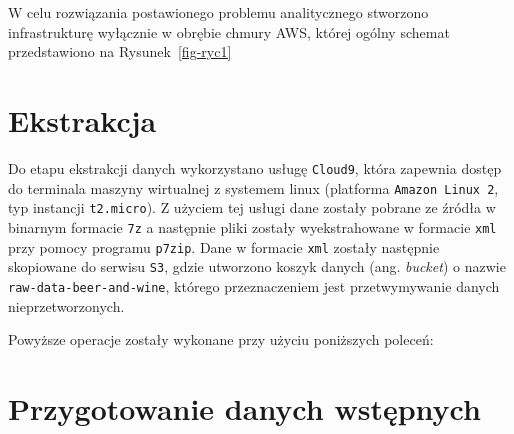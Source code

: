\documentclass[
  letterpaper,
  DIV=11,
  numbers=noendperiod]{scrreprt}
\newenvironment{Shaded}{\begin{snugshade}}{\end{snugshade}}
\newcommand{\NormalTok}[1]{\textcolor[rgb]{0.00,0.23,0.31}{#1}}
\begin{document}
W celu rozwiązania postawionego problemu analitycznego stworzono
infrastrukturę wyłącznie w obrębie chmury AWS, której ogólny schemat
przedstawiono na Rysunek~\ref{fig-ryc1}

\hypertarget{ekstrakcja}{%
\section{Ekstrakcja}\label{ekstrakcja}}

Do etapu ekstrakcji danych wykorzystano usługę \texttt{Cloud9}, która
zapewnia dostęp do terminala maszyny wirtualnej z systemem linux
(platforma \texttt{Amazon\ Linux\ 2}, typ instancji \texttt{t2.micro}).
Z użyciem tej usługi dane zostały pobrane ze źródła w binarnym formacie
\texttt{7z} a następnie pliki zostały wyekstrahowane w formacie
\texttt{xml} przy pomocy programu \texttt{p7zip}. Dane w formacie
\texttt{xml} zostały następnie skopiowane do serwisu \texttt{S3}, gdzie
utworzono koszyk danych (ang. \emph{bucket}) o nazwie
\texttt{raw-data-beer-and-wine}, którego przeznaczeniem jest
przetwymywanie danych nieprzetworzonych.

Powyższe operacje zostały wykonane przy użyciu poniższych poleceń:

\begin{Shaded}
\end{Shaded}

\hypertarget{przygotowanie-danych-wstux119pnych}{%
\section{Przygotowanie danych
wstępnych}\label{przygotowanie-danych-wstux119pnych}}
\end{document}
